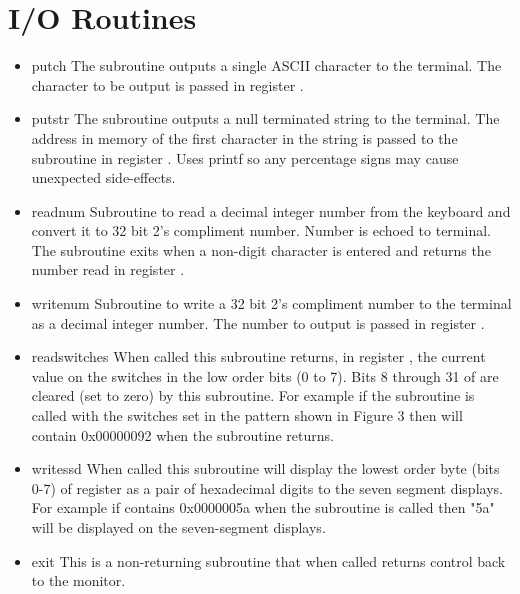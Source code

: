 \documentclass[a4paper,10pt]{article}
\begin{document}
\section{I/O Routines}
\begin{footnotesize}
\begin{itemize}
\item putch 
The subroutine outputs a single ASCII character to the
terminal. The character to be output is passed in register .

\item putstr 
The subroutine outputs a null terminated string to the
terminal. The address in memory of the first character in the string
is passed to the subroutine in register . Uses printf so any
percentage signs may cause unexpected side-effects.

\item readnum 
Subroutine to read a decimal integer number from the keyboard
and convert it to 32 bit 2's compliment number. Number is echoed to
terminal. The subroutine exits when a non-digit character is entered
and returns the number read in register .

\item writenum 
Subroutine to write a 32 bit 2's compliment number to the
terminal as a decimal integer number. The number to output is passed
in register .

\item readswitches 
When called this subroutine returns, in register
, the current value on the switches in the low order bits (0 to
7). Bits 8 through 31 of  are cleared (set to zero) by this
subroutine. For example if the subroutine is called with the switches
set in the pattern shown in Figure 3 then  will contain 0x00000092
when the subroutine returns.

\item writessd 
When called this subroutine will display the lowest
order byte (bits 0-7) of register  as a pair of hexadecimal digits
to the seven segment displays. For example if  contains 0x0000005a
when the subroutine is called then "5a" will be displayed on the
seven-segment displays.

\item exit 
This is a non-returning subroutine that when called returns
control back to the monitor.
\end{itemize}
\end{footnotesize}


\thispagestyle{rcsfooters}
\pagestyle{rcsfooters}
\end{document}

